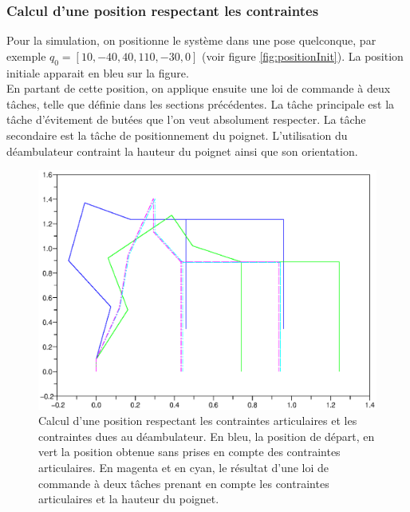 \documentclass[a4paper, 10pt ]{article}
\begin{document}
\subsubsection{Calcul d'une position respectant les contraintes}


Pour la simulation, on positionne le système dans une pose quelconque, par exemple $q_0=[10, -40, 40,110,-30,0]$ (voir figure \ref{fig:positionInit}). La position initiale apparait en bleu sur la figure. \\

En partant de cette position, on applique ensuite une loi de commande à deux tâches, telle que définie dans les sections précédentes. La tâche principale est la tâche d'évitement de butées que l'on veut absolument respecter. La tâche secondaire est la tâche de positionnement du poignet. L'utilisation du déambulateur contraint la hauteur du poignet ainsi que son orientation.\\



\begin{figure}[h]
\centering
\includegraphics[width=0.8\columnwidth]{images/simu/applyConst.eps}
\caption{Calcul d'une position respectant les contraintes articulaires et les contraintes dues au déambulateur. En bleu, la position de départ, en vert la position obtenue sans prises en compte des contraintes articulaires. En magenta et en cyan, le résultat d'une loi de commande à deux tâches prenant en compte les contraintes articulaires et la hauteur du poignet.}
\label{fig:positionContrainte}
\end{figure}
\end{document}
